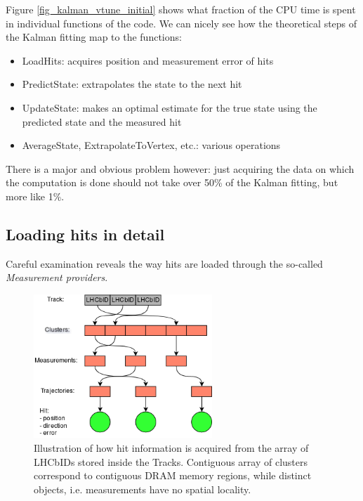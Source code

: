 \documentclass[12pt]{article}
\begin{document}
Figure \ref{fig_kalman_vtune_initial} shows what fraction of the CPU time is spent in individual functions of the code. We can nicely see how the theoretical steps of the Kalman fitting map to the functions:
\begin{itemize}
	\item LoadHits: acquires position and measurement error of hits
	\item PredictState: extrapolates the state to the next hit
	\item UpdateState: makes an optimal estimate for the true state using the predicted state and the measured hit
	\item AverageState, ExtrapolateToVertex, etc.: various operations
\end{itemize}
There is a major and obvious problem however: just acquiring the data on which the computation is done should not take over 50\% of the Kalman fitting, but more like 1\%.	


\subsection{Loading hits in detail}

Careful examination reveals the way hits are loaded through the so-called \textit{Measurement providers}.
	
\begin{figure}[H]
	\begin{center}
		\includegraphics[width=0.6\textwidth]{kalmanfit_loadhits_schematic}
	\end{center}
	\caption{Illustration of how hit information is acquired from the array of LHCbIDs stored inside the Tracks. Contiguous array of clusters correspond to contiguous DRAM memory regions, while distinct objects, i.e. measurements have no spatial locality.}
	\label{fig_kalmanfit_loadhits_schematic}
\end{figure}
\end{document}
